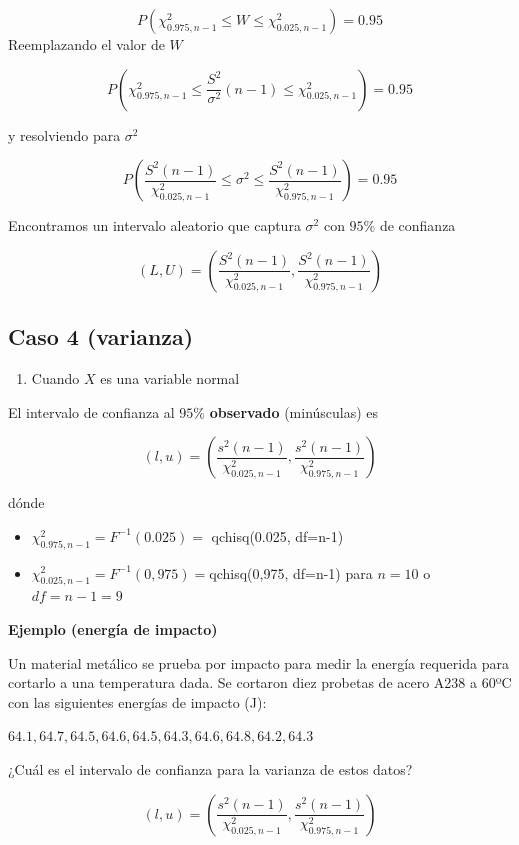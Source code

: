 \documentclass[
]{book}
\providecommand{\tightlist}{%
  \setlength{\itemsep}{0pt}\setlength{\parskip}{0pt}}
\begin{document}
\[P(\chi^2_{0.975,n-1} \leq W \leq \chi^2_{0.025,n-1})=0.95\]
Reemplazando el valor de \(W\)

\[P(\chi^2_{0.975,n-1} \leq \frac{S^2}{\sigma^2}(n-1) \leq \chi^2_{0.025,n-1})= 0.95\]

y resolviendo para \(\sigma^2\)

\[P(\frac{S^2 (n-1)}{\chi^2_{0.025,n-1}}\leq \sigma^2 \leq \frac{S^2(n-1)}{ \chi^2_{0.975,n-1}})=0.95\]

Encontramos un intervalo aleatorio que captura \(\sigma^2\)
con \(95\%\) de confianza

\[(L,U) = (\frac{S^2 (n-1)}{\chi^2_{0.025,n-1}},\frac{S^2(n-1)}{\chi ^2_{0.975,n-1}})\]

\hypertarget{caso-4-varianza}{%
\subsection{Caso 4 (varianza)}\label{caso-4-varianza}}

\begin{enumerate}
\def\labelenumi{\arabic{enumi}.}
\tightlist
\item
  Cuando \(X\) es una variable normal
\end{enumerate}

El intervalo de confianza al \(95\%\) \textbf{observado} (minúsculas) es

\[(l,u) = (\frac{s^2 (n-1)}{\chi^2_{0.025,n-1}},\frac{s^2(n-1)}{\chi ^2_{0.975,n-1}})\]

dónde

\begin{itemize}
\item
  \(\chi^2_{0.975,n-1}=F^{-1}(0.025)=\) qchisq(0.025, df=n-1)
\item
  \(\chi^2_{0.025, n-1}=F^{-1}(0,975)=\)qchisq(0,975, df=n-1)
  para \(n=10\) o \(df=n-1=9\)
\end{itemize}

\textbf{Ejemplo (energía de impacto)}

Un material metálico se prueba por impacto para medir la energía requerida para cortarlo a una temperatura dada. Se cortaron diez probetas de acero A238 a 60ºC con las siguientes energías de impacto (J):

\(64.1, 64.7, 64.5, 64.6, 64.5, 64.3, 64.6, 64.8, 64.2, 64.3\)

¿Cuál es el intervalo de confianza para la varianza de estos datos?

\[(l,u) = (\frac{s^2 (n-1)}{\chi^2_{0.025,n-1}},\frac{s^2(n-1)}{\chi ^2_{0.975,n-1}})\]
\end{document}
